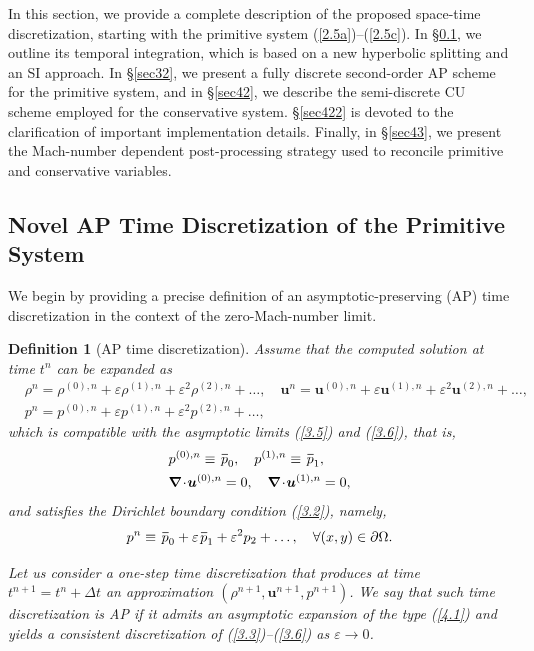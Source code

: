 \documentclass[A4paper,12pt,twoside]{article}
\newtheorem{definition}{Definition}[section]
\numberwithin{equation}{section}
\numberwithin{figure}{section}
\numberwithin{table}{section}
\def\bnabla{\bm{\nabla}}
\newcommand{\dt}{\Delta t}
\newcommand{\ve}{\varepsilon}
\newcommand\eref[1]{(\ref{#1})}
\newcommand*\xbar[1]{%
  \hbox{%
    \vbox{%
      \hrule height 0.5pt %
      \kern0.4ex%
      \hbox{%
        \kern-0.05em%
        \ensuremath{#1}%
        \kern-0.00em%
      }%
    }%
  }%
}
\begin{document}
In this section, we provide a complete description of the proposed space-time discretization, starting with the primitive system
\eref{2.5a}–\eref{2.5c}. In \S\ref{sec411}, we outline its temporal integration, which is based on a new hyperbolic splitting and an SI
approach. In \S\ref{sec32}, we present a fully discrete second-order AP scheme for the primitive system, and in \S\ref{sec42}, we describe
the semi-discrete CU scheme employed for the conservative system. \S\ref{sec422} is devoted to the clarification of important
implementation details. Finally, in \S\ref{sec43}, we present the Mach-number dependent post-processing strategy used to reconcile primitive
and conservative variables.

\subsection{Novel AP Time Discretization of the Primitive System}\label{sec411}
We begin by providing a precise definition of an asymptotic-preserving (AP) time discretization in the context of the zero-Mach-number
limit.
\begin{definition}[AP time discretization]\label{def41}
Assume that the computed solution at time $t^n$ can be expanded as
\begin{equation}
\begin{aligned}
&\rho^n=\rho^{(0),n}+\ve\rho^{(1),n}+\ve^2\rho^{(2),n}+\dots,\quad\bm u^n=\bm u^{(0),n}+\ve\bm u^{(1),n}+\ve^2\bm u^{(2),n}+\dots,\\
&p^n=p^{(0),n}+\ve p^{(1),n}+\ve^2p^{(2),n}+\dots,
\end{aligned}
\label{4.1}
\end{equation}
which is compatible with the asymptotic limits \eref{3.5} and \eref{3.6}, that is,
\begin{align}
&p^{(0),n}\equiv\,\xbar p_0,\quad p^{(1),n}\equiv\,\xbar p_1,\label{3.2f}\\
&\bnabla\!\cdot\!\bm u^{(0),n}=0,\quad\bnabla\!\cdot\!\bm u^{(1),n}=0,\label{4.2}
\end{align}
and satisfies the Dirichlet boundary condition \eref{3.2}, namely,
\begin{equation}
p^n\equiv\,\xbar p_0+\ve\,\xbar p_1+\ve^2p_2+\dots,\quad\forall(x,y)\in\partial\Omega.
\label{3.4f}
\end{equation}

Let us consider a one-step time discretization that produces at time $t^{n+1}=t^n+\dt$ an approximation $(\rho^{n+1},\bm u^{n+1},p^{n+1})$.
We say that such time discretization is AP if it admits an asymptotic expansion of the type \eref{4.1} and yields a consistent
discretization of \eref{3.3}--\eref{3.6} as $\ve\to0$.
\end{definition}
\end{document}
